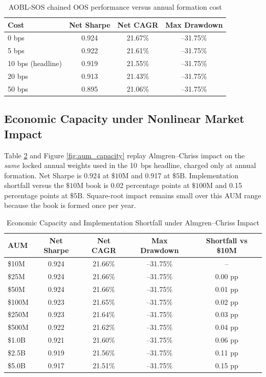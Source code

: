 \documentclass[11pt,a4paper]{article}
\begin{document}
\begin{table}[htbp]
\centering
\caption{AOBL-SOS chained OOS performance versus annual formation cost}
\label{tab:cost_sens}
\begin{tabular}{lccc}
\toprule
\textbf{Cost} & \textbf{Net Sharpe} & \textbf{Net CAGR} & \textbf{Max Drawdown} \\
\midrule
0 bps & 0.924 & 21.67\% & --31.75\% \\
5 bps & 0.922 & 21.61\% & --31.75\% \\
10 bps (headline) & 0.919 & 21.55\% & --31.75\% \\
20 bps & 0.913 & 21.43\% & --31.75\% \\
50 bps & 0.895 & 21.06\% & --31.75\% \\
\bottomrule
\end{tabular}
\end{table}

\subsection{Economic Capacity under Nonlinear Market Impact}
\label{sec:aum_capacity}
Table \ref{tab:aum_capacity} and Figure \ref{fig:aum_capacity} replay Almgren--Chriss impact on the \emph{same} locked annual weights used in the 10~bps headline, charged only at annual formation. Net Sharpe is 0.924 at $\$10\text{M}$ and 0.917 at $\$5\text{B}$. Implementation shortfall versus the $\$10\text{M}$ book is 0.02 percentage points at $\$100\text{M}$ and 0.15 percentage points at $\$5\text{B}$. Square-root impact remains small over this AUM range because the book is formed once per year.

\begin{table}[htbp]
\centering
\caption{Economic Capacity and Implementation Shortfall under Almgren--Chriss Impact}
\label{tab:aum_capacity}
\begin{tabular}{lcccc}
\toprule
\textbf{AUM} & \textbf{Net Sharpe} & \textbf{Net CAGR} & \textbf{Max Drawdown} & \textbf{Shortfall vs \$10M} \\
\midrule
\$10M & 0.924 & 21.66\% & --31.75\% & -- \\
\$25M & 0.924 & 21.66\% & --31.75\% & 0.00 pp \\
\$50M & 0.924 & 21.66\% & --31.75\% & 0.01 pp \\
\$100M & 0.923 & 21.65\% & --31.75\% & 0.02 pp \\
\$250M & 0.923 & 21.64\% & --31.75\% & 0.03 pp \\
\$500M & 0.922 & 21.62\% & --31.75\% & 0.04 pp \\
\$1.0B & 0.921 & 21.60\% & --31.75\% & 0.06 pp \\
\$2.5B & 0.919 & 21.56\% & --31.75\% & 0.11 pp \\
\$5.0B & 0.917 & 21.51\% & --31.75\% & 0.15 pp \\
\bottomrule
\end{tabular}
\end{table}
\end{document}
